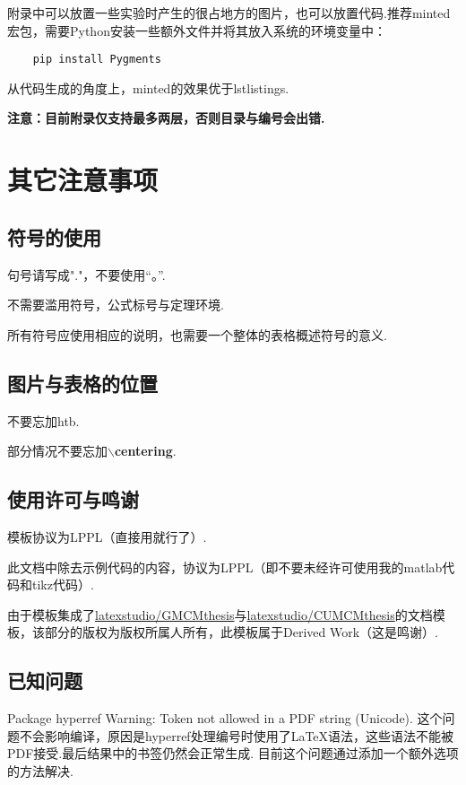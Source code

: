 \documentclass[bwprint, withouttitlepage]{mathexpthesis}
\begin{document}
附录中可以放置一些实验时产生的很占地方的图片，也可以放置代码.推荐minted宏包，需要Python安装一些额外文件并将其放入系统的环境变量中：
\begin{verbatim}
    pip install Pygments
\end{verbatim}

从代码生成的角度上，minted的效果优于lstlistings.

\textbf{注意：目前附录仅支持最多两层，否则目录与编号会出错.}

\section{其它注意事项}
\subsection{符号的使用}
句号请写成"."，不要使用“。”.

不需要滥用符号，公式标号与定理环境.

所有符号应使用相应的说明，也需要一个整体的表格概述符号的意义.

\subsection{图片与表格的位置}
不要忘加htb.

部分情况不要忘加$\backslash$\textbf{centering}.

\subsection{使用许可与鸣谢}
模板协议为LPPL（直接用就行了）.

此文档中除去示例代码的内容，协议为LPPL（即不要未经许可使用我的matlab代码和tikz代码）.

由于模板集成了\href{https://github.com/latexstudio/GMCMthesis}{latexstudio/GMCMthesis}与\href{https://github.com/latexstudio/CUMCMthesis}{latexstudio/CUMCMthesis}的文档模板，该部分的版权为版权所属人所有，此模板属于Derived Work（这是鸣谢）.

\subsection{已知问题}
Package hyperref Warning: Token not allowed in a PDF string (Unicode). 这个问题不会影响编译，原因是hyperref处理编号时使用了\LaTeX 语法，这些语法不能被PDF接受.最后结果中的书签仍然会正常生成. 目前这个问题通过添加一个额外选项的方法解决.
\end{document}
